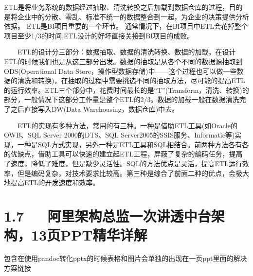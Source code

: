 \documentclass[letterpaper,12pt,english]{sphinxmanual}
\begin{document}





ETL是将业务系统的数据经过抽取、清洗转换之后加载到数据仓库的过程，目的是将企业中的分散、零乱、标准不统一的数据整合到一起，为企业的决策提供分析依据。 ETL是BI项目重要的一个环节。 通常情况下，在BI项目中ETL会花掉整个项目至少1/3的时间,ETL设计的好坏直接关接到BI项目的成败。

　　ETL的设计分三部分：数据抽取、数据的清洗转换、数据的加载。在设计ETL的时候我们也是从这三部分出发。数据的抽取是从各个不同的数据源抽取到ODS(Operational Data Store，操作型数据存储)中——这个过程也可以做一些数据的清洗和转换)，在抽取的过程中需要挑选不同的抽取方法，尽可能的提高ETL的运行效率。ETL三个部分中，花费时间最长的是“T”(Transform，清洗、转换)的部分，一般情况下这部分工作量是整个ETL的2/3。数据的加载一般在数据清洗完了之后直接写入DW(Data Warehousing，数据仓库)中去。

　　ETL的实现有多种方法，常用的有三种。一种是借助ETL工具(如Oracle的OWB、SQL Server 2000的DTS、SQL Server2005的SSIS服务、Informatic等)实现，一种是SQL方式实现，另外一种是ETL工具和SQL相结合。前两种方法各有各的优缺点，借助工具可以快速的建立起ETL工程，屏蔽了复杂的编码任务，提高了速度，降低了难度，但是缺少灵活性。SQL的方法优点是灵活，提高ETL运行效率，但是编码复杂，对技术要求比较高。第三种是综合了前面二种的优点，会极大地提高ETL的开发速度和效率。


\section{1.7   阿里架构总监一次讲透中台架构，13页PPT精华详解}
\label{\detokenize{000misc/memo:ppt}}

包含在使用pandoc转化pptx的时候表格和图片会单独的出现在一页ppt里面的解决方案链接

\end{document}
